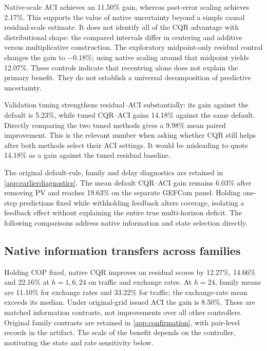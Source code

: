 \documentclass[preprint,11pt]{elsarticle}
\begin{document}
Native-scale ACI achieves an 11.50\% gain, whereas past-error scaling achieves 2.17\%.
This supports the value of native uncertainty beyond a simple causal residual-scale
estimate. It does not identify all of the CQR advantage with distributional shape:
the compared intervals differ in centering and additive versus multiplicative construction.
The exploratory midpoint-only residual control changes the gain to $-0.18\%$; using
native scaling around that midpoint yields 12.07\%. These controls indicate that
recentring alone does not explain the primary benefit. They do not establish a universal
decomposition of predictive uncertainty.

Validation tuning strengthens residual--ACI substantially: its gain against the default
is 5.23\%, while tuned CQR--ACI gains 14.18\% against the same default. Directly comparing
the two tuned methods gives a 9.98\% mean paired improvement. This is the relevant number
when asking whether CQR still helps after both methods select their ACI settings. It
would be misleading to quote 14.18\% as a gain against the tuned residual baseline.

The original default-rule, family and delay diagnostics are retained in
\ref{app:earlierdiagnostics}. The mean default CQR--ACI gain remains 6.03\%
after removing PV and reaches 19.63\% on the separate GEFCom panel. Holding
one-step predictions fixed while withholding feedback alters coverage, isolating
a feedback effect without explaining the entire true multi-horizon deficit.
The following comparisons address native information and state selection directly.

\subsection{Native information transfers across families}\label{sec:confirmresults}
Holding COP fixed, native CQR improves on residual scores by 12.27\%, 14.66\% and
22.16\% at $h=1,6,24$ on traffic and exchange rates. At $h=24$, family means are
11.10\% for exchange rates and 33.22\% for traffic; the exchange-rate mean exceeds
its median. Under original-grid issued ACI the gain is 8.50\%. These are matched
information contrasts, not improvements over all other controllers. Original
family contrasts are retained in \ref{app:confirmation}, with pair-level records in the artifact.
The scale of the benefit depends on the controller, motivating the state and rate
sensitivity below.
\end{document}
